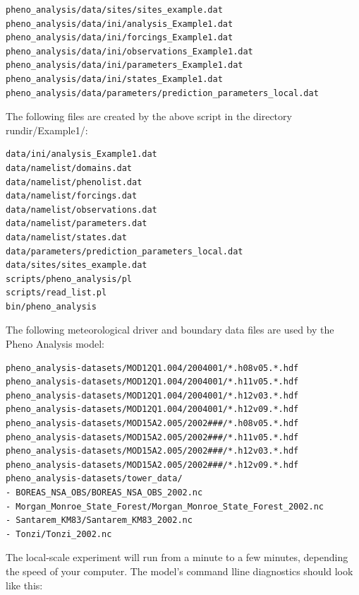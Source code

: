 \documentclass[a4paper,12pt]{article}
\begin{document}
\begin{verbatim}
pheno_analysis/data/sites/sites_example.dat
pheno_analysis/data/ini/analysis_Example1.dat
pheno_analysis/data/ini/forcings_Example1.dat
pheno_analysis/data/ini/observations_Example1.dat
pheno_analysis/data/ini/parameters_Example1.dat
pheno_analysis/data/ini/states_Example1.dat
pheno_analysis/data/parameters/prediction_parameters_local.dat
\end{verbatim}
The following files are created by the above script in the directory rundir/Example1/:
\begin{verbatim}
data/ini/analysis_Example1.dat
data/namelist/domains.dat
data/namelist/phenolist.dat
data/namelist/forcings.dat
data/namelist/observations.dat
data/namelist/parameters.dat
data/namelist/states.dat
data/parameters/prediction_parameters_local.dat
data/sites/sites_example.dat
scripts/pheno_analysis/pl
scripts/read_list.pl
bin/pheno_analysis
\end{verbatim}
The following meteorological driver and boundary data files are used by the Pheno Analysis model:
\begin{verbatim}
pheno_analysis-datasets/MOD12Q1.004/2004001/*.h08v05.*.hdf
pheno_analysis-datasets/MOD12Q1.004/2004001/*.h11v05.*.hdf
pheno_analysis-datasets/MOD12Q1.004/2004001/*.h12v03.*.hdf
pheno_analysis-datasets/MOD12Q1.004/2004001/*.h12v09.*.hdf
pheno_analysis-datasets/MOD15A2.005/2002###/*.h08v05.*.hdf
pheno_analysis-datasets/MOD15A2.005/2002###/*.h11v05.*.hdf
pheno_analysis-datasets/MOD15A2.005/2002###/*.h12v03.*.hdf
pheno_analysis-datasets/MOD15A2.005/2002###/*.h12v09.*.hdf
pheno_analysis-datasets/tower_data/
- BOREAS_NSA_OBS/BOREAS_NSA_OBS_2002.nc
- Morgan_Monroe_State_Forest/Morgan_Monroe_State_Forest_2002.nc
- Santarem_KM83/Santarem_KM83_2002.nc
- Tonzi/Tonzi_2002.nc
\end{verbatim}
The local-scale experiment will run from a minute to a few minutes, depending the speed of your computer. The model's command lline diagnostics should look like this:
\end{document}
